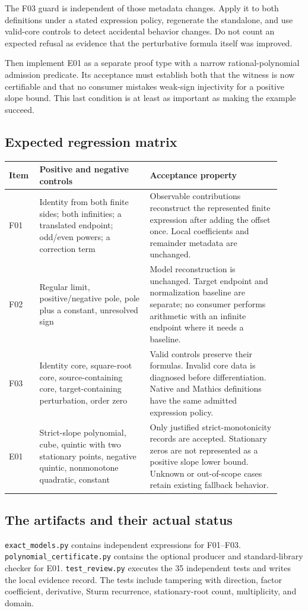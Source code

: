 \documentclass[11pt,letterpaper]{article}
\newcommand{\code}[1]{\nolinkurl{#1}}
\begin{document}
The F03 guard is independent of those metadata changes. Apply it to both definitions under a stated expression policy, regenerate the standalone, and use valid-core controls to detect accidental behavior changes. Do not count an expected refusal as evidence that the perturbative formula itself was improved.

Then implement E01 as a separate proof type with a narrow rational-polynomial admission predicate. Its acceptance must establish both that the witness is now certifiable and that no consumer mistakes weak-sign injectivity for a positive slope bound. This last condition is at least as important as making the example succeed.

\subsection{Expected regression matrix}
\begin{longtable}{@{}p{0.10\linewidth}p{0.37\linewidth}p{0.44\linewidth}@{}}
\toprule
Item & Positive and negative controls & Acceptance property\\
\midrule
\endhead
F01 & Identity from both finite sides; both infinities; a translated endpoint; odd/even powers; a correction term & Observable contributions reconstruct the represented finite expression after adding the offset once. Local coefficients and remainder metadata are unchanged.\\[5pt]
F02 & Regular limit, positive/negative pole, pole plus a constant, unresolved sign & Model reconstruction is unchanged. Target endpoint and normalization baseline are separate; no consumer performs arithmetic with an infinite endpoint where it needs a baseline.\\[5pt]
F03 & Identity core, square-root core, source-containing core, target-containing perturbation, order zero & Valid controls preserve their formulas. Invalid core data is diagnosed before differentiation. Native and Mathics definitions have the same admitted expression policy.\\[5pt]
E01 & Strict-slope polynomial, cube, quintic with two stationary points, negative quintic, nonmonotone quadratic, constant & Only justified strict-monotonicity records are accepted. Stationary zeros are not represented as a positive slope lower bound. Unknown or out-of-scope cases retain existing fallback behavior.\\
\bottomrule
\end{longtable}

\subsection{The artifacts and their actual status}
\code{exact_models.py} contains independent expressions for F01--F03. \code{polynomial_certificate.py} contains the optional producer and standard-library checker for E01. \code{test_review.py} executes the 35 independent tests and writes the local evidence record. The tests include tampering with direction, factor coefficient, derivative, Sturm recurrence, stationary-root count, multiplicity, and domain.
\end{document}

